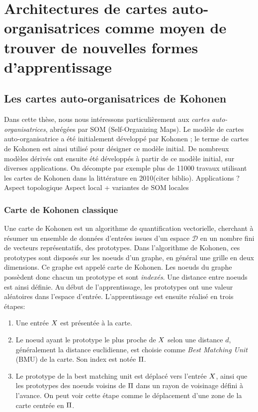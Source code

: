 \documentclass[../main]{subfiles}
\begin{document}
\graphicspath{{./figures}}
\chapter{Architectures de cartes auto-organisatrices comme moyen de trouver de nouvelles formes d'apprentissage}
\minitoc
\section{Les cartes auto-organisatrices de Kohonen}\label{sec:som001}

Dans cette thèse, nous nous intéressons particulièrement aux \emph{cartes auto-organisatrices}, abrégées par SOM (Self-Organizing Maps). Le modèle de cartes auto-organisatrice a été initialement développé par Kohonen \cite{Kohonen1982}; le terme de cartes de Kohonen est ainsi utilisé pour désigner ce modèle initial. De nombreux modèles dérivés ont ensuite été développés à partir de ce modèle initial, sur diverses applications. On décompte par exemple plus de 11000 travaux utilisant les cartes de Kohonen dans la littérature en 2010(citer biblio).
Applications ?
Aspect topologique
Aspect local + variantes de SOM locales

\subsection{Carte de Kohonen classique}
Une carte de Kohonen est un algorithme de quantification vectorielle, cherchant à résumer un ensemble de données d'entrées issues d'un espace $\mathcal{D}$ en un nombre fini de vecteurs représentatifs, des prototypes.  Dans l'algorithme de Kohonen, ces prototypes sont disposés sur les noeuds d'un graphe, en général une grille en deux dimensions. Ce graphe est appelé carte de Kohonen. Les noeuds du graphe possèdent donc chacun un prototype et sont \emph{indexés}. Une distance entre noeuds est ainsi définie.
Au début de l'apprentissage, les prototypes ont une valeur aléatoires dans l'espace d'entrée. L'apprentissage est ensuite réalisé en trois étapes:
\begin{enumerate}
\item Une entrée $X$ est présentée à la carte.
\item Le noeud ayant le prototype le plus proche de $X$ selon une distance $d$, généralement la distance euclidienne, est choisie comme \emph{Best Matching Unit} (BMU) de la carte. Son index est notée $\Pi$.
\item Le prototype de la best matching unit est déplacé vers l'entrée $X$, ainsi que les prototypes des noeuds voisins de $\Pi$ dans un rayon de voisinage défini à l'avance. On peut voir cette étape comme le déplacement d'une zone de la carte centrée en $\Pi$.
\end{enumerate}
\end{document}
